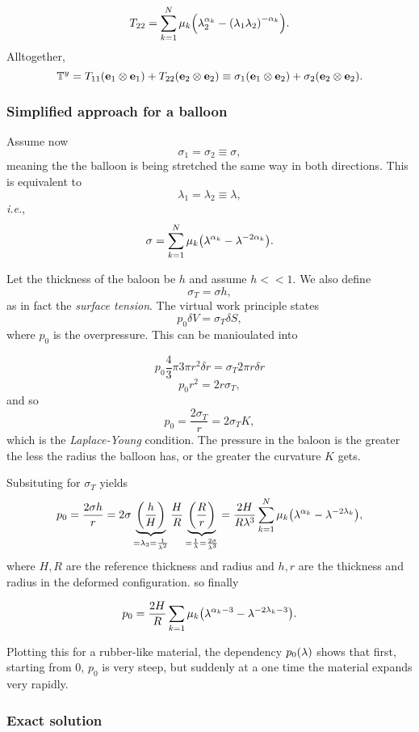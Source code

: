 \documentclass[11pt]{scrartcl} %
\begin{document}
\[
	T_{22} = \sum_{k=1}^N \mu_k \qty(\lambda_2^{\alpha_k}- \qty(\lambda_1 \lambda_2)^{-\alpha_k}).
\]
Alltogether,
\[
	\mathbb{T}^y = T_{11} \qty(\vb{e}_1 \otimes \vb{e}_1) + T_{22} \qty(\vb{e}_2 \otimes \vb{e}_2) \equiv \sigma_1 \qty(\vb{e}_1 \otimes \vb{e}_2) + \sigma_2 \qty(\vb{e}_2 \otimes \vb{e}_2).
\]

\subsubsection{Simplified approach for a balloon}
\label{sec:balloon_simplified}

Assume now
\[
	\sigma_1 = \sigma_2 \equiv \sigma,
\]
meaning the the balloon is being stretched the same way in both directions. This is equivalent to
\[
	\lambda_1 = \lambda_2 \equiv \lambda,
\]
\textit{i.e.},
\[
	\sigma = \sum_{k=1}^N \mu_k \qty(\lambda^{\alpha_k} - \lambda^{-2 \alpha_k}).
\]

Let the thickness of the baloon be $h$ and assume $h << 1.$ We also define
\[
	\sigma_T = \sigma h,
\]
as in fact the \textit{surface tension}. The virtual work principle states
\[
	p_0 \delta V = \sigma_T \delta S, 
\]
where $p_0$ is the overpressure. This can be manioulated into

\[
	p_0 \frac{4}{3} \pi 3 \pi r^{2} \delta r= \sigma_T 2 \pi r \delta r
\]
\[
	p_0 r^{2} = 2 r \sigma_T,
\]
and so
\[
	p_0 = \frac{2 \sigma_T}{r} = 2 \sigma_T K,
\]
which is the \textit{Laplace-Young} condition. The pressure in the baloon is the greater the less the radius the balloon has, or the greater the curvature $K$ gets.

Subsituting for $\sigma_T$ yields
\[
p_0 = \frac{2 \sigma h}{r} = 2 \sigma\underbrace{\qty(\frac{h}{H})}_{= \lambda_3 = \frac{1}{\lambda^{2}}} \frac{H}{R} \underbrace{\qty(\frac{R}{r})}_{= \frac{1}{\lambda} = \frac{2 \sigma}{\lambda^{3}}} = \frac{2H}{R \lambda^{3}} \sum_{k=1}^N \mu_k \qty(\lambda^{\alpha_k}- \lambda^{-2 \lambda_k}),
\]
where $H,R$ are the reference thickness and radius and $h,r$ are the thickness and radius in the deformed configuration.
so finally 

\[
	p_0 = \frac{2H}{R}\sum_{k=1}\mu_k \qty(\lambda^{\alpha_k-3}- \lambda^{-2 \lambda_k -3}).
\]

Plotting this for a rubber-like material, the dependency $p_0\qty(\lambda)$ shows that first, starting from 0, $p_0$ is very steep, but suddenly at a one time the material expands very rapidly.


\subsubsection{Exact solution}
\label{sec:exact_solution}
\end{document}
